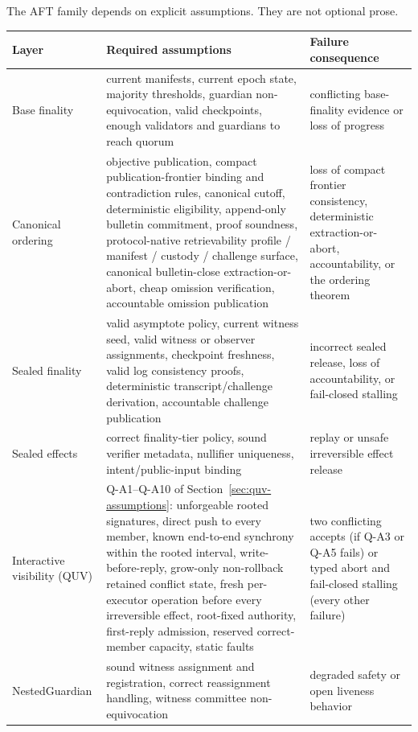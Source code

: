 \documentclass[11pt]{article}
\newcommand{\AFT}{\textsc{AFT}}
\begin{document}
The \AFT{} family depends on explicit assumptions. They are not optional prose.

\begin{center}
\small
\begin{tabularx}{\textwidth}{>{\raggedright\arraybackslash}p{} >{\raggedright\arraybackslash}p{} X}
\toprule
\textbf{Layer} & \textbf{Required assumptions} & \textbf{Failure consequence} \\
\midrule
Base finality & current manifests, current epoch state, majority thresholds, guardian non-equivocation, valid checkpoints, enough validators and guardians to reach quorum & conflicting base-finality evidence or loss of progress \\
Canonical ordering & objective publication, compact publication-frontier binding and contradiction rules, canonical cutoff, deterministic eligibility, append-only bulletin commitment, proof soundness, protocol-native retrievability profile / manifest / custody / challenge surface, canonical bulletin-close extraction-or-abort, cheap omission verification, accountable omission publication & loss of compact frontier consistency, deterministic extraction-or-abort, accountability, or the ordering theorem \\
Sealed finality & valid asymptote policy, current witness seed, valid witness or observer assignments, checkpoint freshness, valid log consistency proofs, deterministic transcript/challenge derivation, accountable challenge publication & incorrect sealed release, loss of accountability, or fail-closed stalling \\
Sealed effects & correct finality-tier policy, sound verifier metadata, nullifier uniqueness, intent/public-input binding & replay or unsafe irreversible effect release \\
Interactive visibility (QUV) & Q-A1--Q-A10 of Section~\ref{sec:quv-assumptions}: unforgeable rooted signatures, direct push to every member, known end-to-end synchrony within the rooted interval, write-before-reply, grow-only non-rollback retained conflict state, fresh per-executor operation before every irreversible effect, root-fixed authority, first-reply admission, reserved correct-member capacity, static faults & two conflicting accepts (if Q-A3 or Q-A5 fails) or typed abort and fail-closed stalling (every other failure) \\
NestedGuardian & sound witness assignment and registration, correct reassignment handling, witness committee non-equivocation & degraded safety or open liveness behavior \\
\bottomrule
\end{tabularx}
\end{center}
\end{document}
